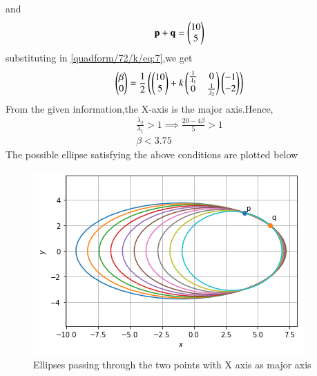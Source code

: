 and
\begin{align}
    \mathbf{p}+\mathbf{q} = \begin{pmatrix}10 \\ 5\end{pmatrix}
\end{align}
substituting in \eqref{quadform/72/k/eq:7},we get
\begin{align}
 \begin{pmatrix}\beta\\0\end{pmatrix}=\frac{1}{2}\left(\begin{pmatrix}10 \\ 5\end{pmatrix} + k\begin{pmatrix}\frac{1}{\lambda_1}&0 \\ 0&\frac{1}{\lambda_2}\end{pmatrix}\begin{pmatrix}-1 \\ -2\end{pmatrix}\right)
\end{align}
From the given information,the X-axis is the major axis.Hence,
\begin{align}
\frac{\lambda_2}{\lambda_1}>1 \implies
    \frac{20-4\beta}{5}>1\\
    \beta<3.75
\end{align}
The possible ellipse satisfying the above conditions are plotted below
\begin{figure}[!ht]
\centering
\includegraphics[width=\columnwidth]{solutions/su2021/2/72/k/Ellipse_(I).PNG}
\caption{Ellipses passing through the two points with X axis as major axis}
\label{quadform/72/k/fig:ellipses}	
\end{figure}

